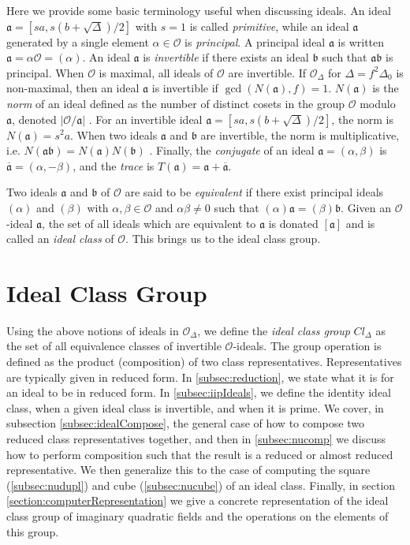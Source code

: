 \documentclass{ucalgthes1}
\theoremstyle{plain}
\theoremstyle{definition}
\newcommand{\OO}{\mathcal{O}}
\begin{document}
Here we provide some basic terminology useful when discussing ideals.  An ideal $\mathfrak{a} = [sa, s(b+\sqrt{\Delta})/2]$ with $s=1$ is called \emph{primitive}, while an ideal $\mathfrak{a}$ generated by a single element $\alpha \in \OO$ is \emph{principal}. A principal ideal $\mathfrak a$ is written $\mathfrak{a} = \alpha \OO = (\alpha)$.  An ideal $\mathfrak{a}$ is \emph{invertible} if there exists an ideal $\mathfrak{b}$ such that $\mathfrak{a}\mathfrak{b}$ is principal.  When $\OO$ is maximal, all ideals of $\OO$ are invertible.  If $\OO_\Delta$ for $\Delta = f^2\Delta_0$ is non-maximal, then an ideal $\mathfrak{a}$ is invertible if $\gcd(N(\mathfrak{a}),f)=1$.  $N(\mathfrak{a})$ is the \emph{norm} of an ideal defined as the number of distinct cosets in the group $\OO$ modulo $\mathfrak{a}$, denoted $|\OO/\mathfrak{a}|$ \cite[pp.~90-91]{Jac09}.  For an invertible ideal $\mathfrak{a} = [sa, s(b+\sqrt{\Delta})/2]$, the norm is $N(\mathfrak{a}) = s^2a$.  When two ideals $\mathfrak{a}$ and $\mathfrak{b}$ are invertible, the norm is multiplicative, i.e. $N(\mathfrak{a}\mathfrak{b}) = N(\mathfrak{a})N(\mathfrak{b})$ \cite[p.~92]{Jac09}.  Finally, the \emph{conjugate} of an ideal $\mathfrak{a} = (\alpha, \beta)$ is $\overline{\mathfrak{a}} = (\alpha, -\beta)$, and the \emph{trace} is $T(\mathfrak a) = \mathfrak a + \overline{\mathfrak a}$.

Two ideals $\mathfrak{a}$ and $\mathfrak{b}$ of $\OO$ are said to be \emph{equivalent} if there exist principal ideals $(\alpha)$ and $(\beta)$ with  $\alpha, \beta \in \OO$ and $\alpha\beta \neq 0$ such that $(\alpha)\mathfrak{a} = (\beta)\mathfrak{b}$.  Given an $\OO$-ideal $\mathfrak{a}$, the set of all ideals which are equivalent to $\mathfrak{a}$ is donated $[\mathfrak{a}]$ and is called an \emph{ideal class} of $\OO$.  This brings us to the ideal class group.


\bigbreak
\section{Ideal Class Group}

Using the above notions of ideals in $\OO_\Delta$, we define the \emph{ideal class group} $Cl_\Delta$ as the set of all equivalence classes of invertible $\OO$-ideals.  The group operation is defined as the product (composition) of two class representatives.  Representatives are typically given in reduced form.  In \ref{subsec:reduction}, we state what it is for an ideal to be in reduced form.  In \ref{subsec:iipIdeals}, we define the identity ideal class, when a given ideal class is invertible, and when it is prime.  We cover, in subsection \ref{subsec:idealCompose}, the general case of how to compose two reduced class representatives together, and then in \ref{subsec:nucomp} we discuss how to perform composition such that the result is a reduced or almost reduced representative.  We then generalize this to the case of computing the square (\ref{subsec:nudupl}) and cube (\ref{subsec:nucube}) of an ideal class.  Finally, in section \ref{section:computerRepresentation} we give a concrete representation of the ideal class group of imaginary quadratic fields and the operations on the elements of this group. 
\end{document}
